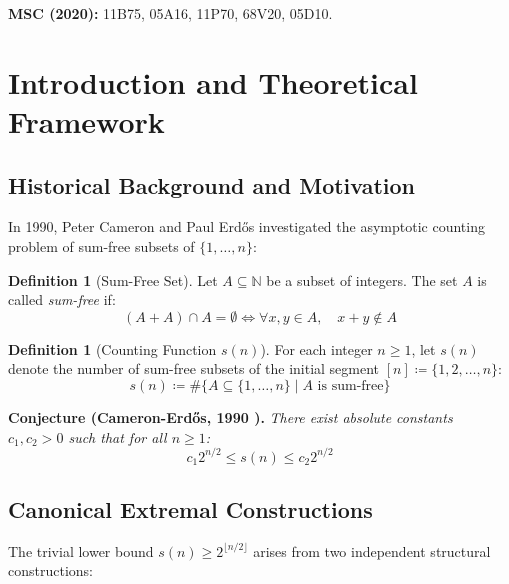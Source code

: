 \documentclass[11pt,a4paper]{article}
\theoremstyle{definition}
\newtheorem{definition}[theorem]{Definition}
\begin{document}
\noindent\textbf{MSC (2020):} 11B75, 05A16, 11P70, 68V20, 05D10.

\tableofcontents
\newpage

\section{Introduction and Theoretical Framework}

\subsection{Historical Background and Motivation}
In 1990, Peter Cameron and Paul Erd\H{o}s \cite{cameron1990} investigated the asymptotic counting problem of sum-free subsets of $\{1, \dots, n\}$:

\begin{definition}[Sum-Free Set]\label{def:sum_free}
Let $A \subseteq \mathbb{N}$ be a subset of integers.
The set $A$ is called \emph{sum-free} if:
\begin{equation}\label{eq:sum_free_def}
(A + A) \cap A = \emptyset \iff \forall x, y \in A, \quad x + y \notin A
\end{equation}
\end{definition}

\begin{definition}[Counting Function $s(n)$]\label{def:counting_sn}
For each integer $n \ge 1$, let $s(n)$ denote the number of sum-free subsets of the initial segment $[n] \coloneqq \{1, 2, \dots, n\}$:
\begin{equation}\label{eq:sn_def}
s(n) \coloneqq \# \{ A \subseteq \{1, \dots, n\} \mid A \text{ is sum-free} \}
\end{equation}
\end{definition}

\noindent\textbf{Conjecture (Cameron-Erd\H{o}s, 1990 \cite{cameron1990}).} \textit{There exist absolute constants $c_1, c_2 > 0$ such that for all $n \ge 1$:}
\begin{equation}\label{eq:cameron_erdos_conj}
c_1 2^{n/2} \le s(n) \le c_2 2^{n/2}
\end{equation}

\subsection{Canonical Extremal Constructions}
The trivial lower bound $s(n) \ge 2^{\lfloor n/2 \rfloor}$ arises from two independent structural constructions:
\end{document}
